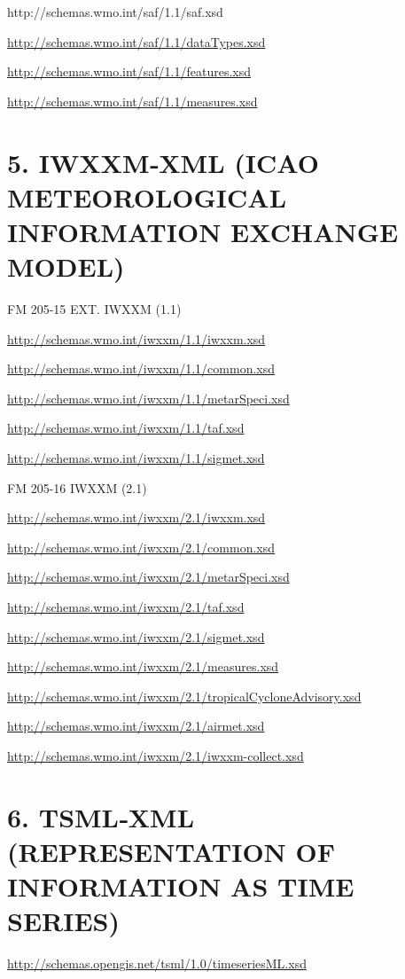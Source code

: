http://schemas.wmo.int/saf/1.1/saf.xsd

\url{http://schemas.wmo.int/saf/1.1/dataTypes.xsd}

\url{http://schemas.wmo.int/saf/1.1/features.xsd}

\url{http://schemas.wmo.int/saf/1.1/measures.xsd}

\hypertarget{iwxxmxml-icao-meteorological-information-exchange-model}{%
\section{5. IWXXM‑XML (ICAO METEOROLOGICAL INFORMATION EXCHANGE MODEL)}\label{iwxxmxml-icao-meteorological-information-exchange-model}}

FM 205-15 EXT. IWXXM (1.1)

\url{http://schemas.wmo.int/iwxxm/1.1/iwxxm.xsd}

\url{http://schemas.wmo.int/iwxxm/1.1/common.xsd}

\url{http://schemas.wmo.int/iwxxm/1.1/metarSpeci.xsd}

\url{http://schemas.wmo.int/iwxxm/1.1/taf.xsd}

\url{http://schemas.wmo.int/iwxxm/1.1/sigmet.xsd}

FM 205-16 IWXXM (2.1)

\url{http://schemas.wmo.int/iwxxm/2.1/iwxxm.xsd}

\url{http://schemas.wmo.int/iwxxm/2.1/common.xsd}

\url{http://schemas.wmo.int/iwxxm/2.1/metarSpeci.xsd}

\url{http://schemas.wmo.int/iwxxm/2.1/taf.xsd}

\url{http://schemas.wmo.int/iwxxm/2.1/sigmet.xsd}

\url{http://schemas.wmo.int/iwxxm/2.1/measures.xsd}

\url{http://schemas.wmo.int/iwxxm/2.1/tropicalCycloneAdvisory.xsd}

\url{http://schemas.wmo.int/iwxxm/2.1/airmet.xsd}

\url{http://schemas.wmo.int/iwxxm/2.1/iwxxm-collect.xsd}

\hypertarget{tsmlxml-representation-of-information-as-time-series}{%
\section{6. TSML‑XML (REPRESENTATION OF INFORMATION AS TIME SERIES)}\label{tsmlxml-representation-of-information-as-time-series}}

\url{http://schemas.opengis.net/tsml/1.0/timeseriesML.xsd}
